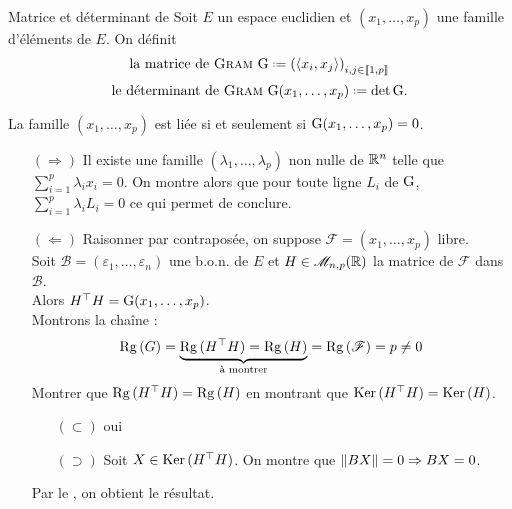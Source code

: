 \begin{defi}{Matrice et déterminant de }
    Soit $E$ un espace euclidien et $(x_1, \dots, x_p)$ une famille d'éléments de $E$. On définit
    $$\text{la matrice de \textsc{Gram} } \Gram \defeq \left( \langle x_i, x_j \rangle \right)_{i,j \in \llbracket 1, p \rrbracket}$$
    $$\text{le déterminant de \textsc{Gram} } \Gram(x_1, \dots, x_p) \defeq \det \Gram.$$
\end{defi}


\begin{prop}
     La famille $(x_1, \dots, x_p)$ est liée si et seulement si $\mathrm{G}(x_1, \dots, x_p) = 0$.
\end{prop}

\begin{preuve}
    \begin{itemize}
        \item[$(\Rightarrow)$] Il existe une famille $(\lambda_1, \dots, \lambda_p)$ non nulle  de $\mathbb{R}^n$ telle que $\sum\limits_{i=1}^{p} \lambda_i x_i = 0$. On montre alors que pour toute ligne $L_i$ de $\mathrm{G}$, $\sum\limits_{i=1}^{p} \lambda_i L_i = 0$ ce qui permet de conclure.
        \item[$(\Leftarrow)$] Raisonner par contraposée, on suppose $\mathscr{F} = (x_1, \dots, x_p)$ libre. \\
        Soit $\mathscr{B} = (\varepsilon_1, \dots, \varepsilon_n)$ une b.o.n. de $E$ et $H \in \mathscr{M}_{n, p} (\mathbb{R})$ la matrice de $\mathscr{F}$ dans $\mathscr{B}$. \\
        Alors $H^\top H = \mathrm{G}(x_1, \dots, x_p)$. \\
        Montrons la chaîne :
        $$\mathrm{Rg}\,(G) = \underbrace{\mathrm{Rg}\,(H^\top H) = \mathrm{Rg}\,(H)}_{\text{à montrer}} = \mathrm{Rg}\,(\mathscr{F}) = p \not= 0$$
        Montrer que $\mathrm{Rg}\,(H^\top H) = \mathrm{Rg}\,(H)$ en montrant que $\mathrm{Ker}\,(H^\top H) = \mathrm{Ker}\,(H)$. 
        \begin{itemize}
            \item[$(\subset)$] oui
            \item[$(\supset)$] Soit $X \in \mathrm{Ker}\,(H^\top H)$. On montre que $\Vert BX \Vert = 0 \Rightarrow BX = 0$. 
        \end{itemize}
        Par le , on obtient le résultat. 
    \end{itemize}
\end{preuve}

